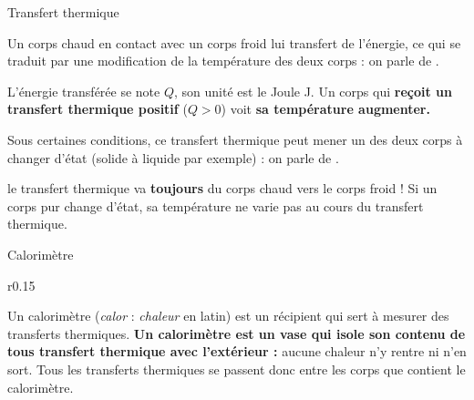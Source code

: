 \begin{doc}{Transfert thermique}
  \vspace*{-20pt}
  \begin{encart}
    Un corps chaud en contact avec un corps froid lui transfert de l'énergie, ce qui se traduit par une modification de la température des deux corps : on parle de .
  \end{encart}
  L'énergie transférée se note $Q$, son unité est le Joule \unit{\joule}.
  Un corps qui \textbf{reçoit un transfert thermique positif} ($Q > 0$) voit \textbf{sa température augmenter.}
  
  \begin{encart}
    Sous certaines conditions, ce transfert thermique peut mener un des deux corps à changer d'état (solide à liquide par exemple) : on parle de .
  \end{encart}
  \attention le transfert thermique va \textbf{toujours} du corps chaud vers le corps froid !
  Si un corps pur change d'état, sa température ne varie pas au cours du transfert thermique.
\end{doc}

\begin{doc}{Calorimètre}
  \vspace*{-34pt}
  \begin{wrapfigure}{r}{0.15\linewidth}
    \centering
    \vspace*{-8pt}
  \end{wrapfigure}
  
  Un calorimètre (\og \textit{calor} \fg : \textit{chaleur} en latin) est un récipient qui sert à mesurer des transferts thermiques.
  \textbf{Un calorimètre est un vase qui isole son contenu de tous transfert thermique avec l'extérieur :} aucune chaleur n'y rentre ni n'en sort.
  Tous les transferts thermiques se passent donc entre les corps que contient le calorimètre.
\end{doc}

